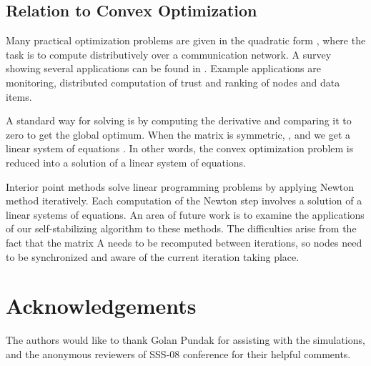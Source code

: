 \documentclass[preprint,12pt]{elsarticle}
\begin{document}
\subsection{Relation to Convex Optimization}
Many practical optimization problems are given in the quadratic
form , where the task is to compute
 distributively over a communication network. A
survey showing several applications can be found in \cite{PPNA08}.
Example applications are monitoring, distributed computation of
trust and ranking of nodes and data items.

A standard way for solving  is by computing the
derivative and comparing it to zero to get the global optimum.
When the matrix  is symmetric, , and we get
a linear system of equations . In other words, the convex
optimization problem is reduced into a solution of a linear system
of equations.

Interior point methods \cite[Ch. 11]{BV04} solve linear programming
problems by applying Newton method iteratively. Each computation
of the Newton step involves a solution of a linear systems of
equations. An area of future work is to examine the applications
of our self-stabilizing algorithm to these methods. The
difficulties arise from the fact that the matrix A needs to be
recomputed between iterations, so nodes need to be synchronized
and aware of the current iteration taking place.

\section*{Acknowledgements}
The authors would like to thank Golan Pundak for
assisting with the simulations, and the anonymous reviewers of SSS-08 conference
for their helpful comments.




\end{document}
